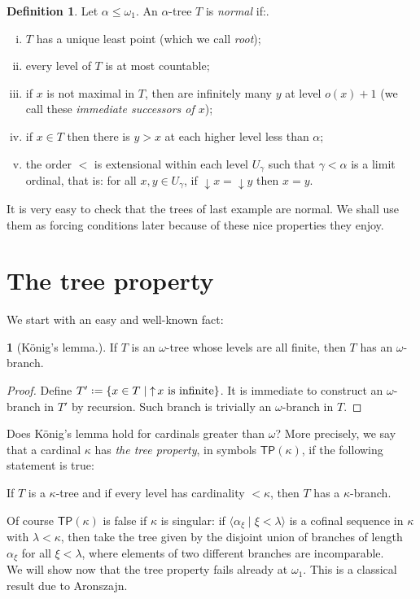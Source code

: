 \documentclass[12pt,a4paper]{report}
\theoremstyle{definition}
\newtheorem{defn}[theorem]{Definition}
\theoremstyle{num.custom-title}
\newtheorem{teo_custom-title}[theorem]{} %
\DeclareMathOperator{\height}{height}
\DeclareMathOperator{\down}{\downarrow}
\DeclareMathOperator{\up}{\uparrow}
\newcommand{\TP}{\ensuremath{\mathsf{TP}}\xspace}
\newcommand*{\defeq}{\mathrel{\rlap{%
                     \raisebox{0.3ex}{$\cdot$}}%
                     \raisebox{-0.3ex}{$\cdot$}}%
                     =}
\begin{document}
\begin{defn}
Let $\alpha \leq \omega_1$. An $\alpha$-tree $T$ is \emph{normal} if:.
\begin{enumerate}[(i)]
\item $T$ has a unique least point (which we call \emph{root});
\item every level of $T$ is at most countable;
\item if $x$ is not maximal in $T$, then are infinitely many $y$ at level $o(x)+1$ (we call these \emph{immediate successors of $x$});
\item if $x \in T$ then there is $y>x$ at each higher level less than $\alpha$;
\item the order $<$ is extensional within each level $U_\gamma$ such that $\gamma < \alpha$ is a limit ordinal, that is: for all $x,y \in U_\gamma$, if $\down x = \down y$ then $x=y$.
\end{enumerate}
\end{defn}

It is very easy to check that the trees of last example are normal. We shall use them as forcing conditions later because of these nice properties they enjoy.

\section{The tree property}

We start with an easy and well-known fact:

\begin{teo_custom-title}[König's lemma.] If $T$ is an $\omega$-tree whose levels are all finite, then $T$ has an $\omega$-branch.
\begin{proof}
Define $T' \defeq \{x \in T \mid \up x \text{ is infinite}\}$. It is immediate to construct an $\omega$-branch in $T'$ by recursion. Such branch is trivially an $\omega$-branch in $T$.
\end{proof}
\end{teo_custom-title}

Does König's lemma hold for cardinals greater than $\omega$? More precisely, we say that a cardinal $\kappa$ has \emph{the tree property}, in symbols $\TP(\kappa)$, if the following statement is true:
\begin{center}
If $T$ is a $\kappa$-tree and if every level has cardinality $<\kappa$, then $T$ has a $\kappa$-branch.
\end{center}
%
Of course $\TP(\kappa)$ is false if $\kappa$ is singular: if $\langle \alpha_\xi \mid \xi < \lambda \rangle$ is a cofinal sequence in $\kappa$ with $\lambda < \kappa$, then take the tree given by the disjoint union of branches of length $\alpha_\xi$ for all $\xi < \lambda$, where elements of two different branches are incomparable.\\
We will show now that the tree property fails already at $\omega_1$. This is a classical result due to Aronszajn.
\end{document}
